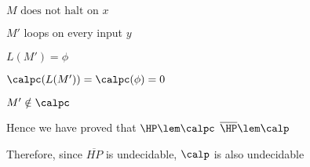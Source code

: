 \imp
$M \text{ does not halt on } x$

\imp
$M'$ loops on every input $y$

\imp
$L(M') = \phi$

\imp
$\calpc(L(M')) = \calpc(\phi) = 0$

\imp
$M' \notin \calpc$



Hence we have proved that ${\HP} \lem \calpc$ \imp $\overline{\HP} \lem \calp$

Therefore, since $\overline{HP}$ is undecidable, $\calp$ is also undecidable
























